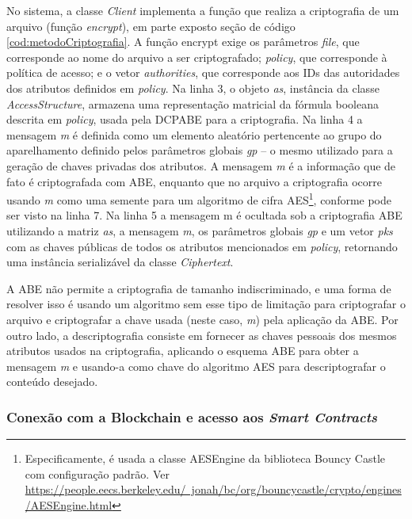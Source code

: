 \documentclass[a4paper,11pt]{article}
\begin{document}
No sistema, a classe \emph{Client} implementa a função que realiza a criptografia de um arquivo (função \emph{encrypt}), em parte exposto seção de código \ref{cod:metodoCriptografia}.
A função encrypt exige os parâmetros \emph{file}, que corresponde ao nome do arquivo a ser criptografado; \emph{policy}, que corresponde à política de acesso; e o vetor \emph{authorities}, que corresponde aos IDs das autoridades dos atributos definidos em \emph{policy}.
Na linha 3, o objeto \emph{as}, instância da classe \emph{AccessStructure}, armazena uma representação matricial da fórmula booleana descrita em \emph{policy}, usada pela DCPABE para a criptografia.
Na linha 4 a mensagem \emph{m} é definida como um elemento aleatório pertencente ao grupo do aparelhamento definido pelos parâmetros globais \emph{gp} -- o mesmo utilizado para a geração de chaves privadas dos atributos.
A mensagem \emph{m} é a informação que de fato é criptografada com ABE, enquanto que no arquivo  a criptografia ocorre usando \emph{m} como uma semente para um algoritmo de cifra AES\footnote{Especificamente, é usada a classe AESEngine da biblioteca Bouncy Castle com configuração padrão. Ver \href{https://people.eecs.berkeley.edu/~jonah/bc/org/bouncycastle/crypto/engines/AESEngine.html}{https://people.eecs.berkeley.edu/~jonah/bc/org/bouncycastle/crypto/engines/AESEngine.html}}, conforme pode ser visto na linha 7.
Na linha 5 a mensagem m é ocultada sob a criptografia ABE utilizando a matriz \emph{as}, a mensagem \emph{m}, os parâmetros globais \emph{gp} e um vetor \emph{pks} com as chaves públicas de todos os atributos mencionados em \emph{policy}, retornando uma instância serializável da classe \emph{Ciphertext}.

A ABE não permite a criptografia de tamanho indiscriminado, e uma forma de resolver isso é usando um algoritmo sem esse tipo de limitação para criptografar o arquivo e criptografar a chave usada (neste caso, \emph{m}) pela aplicação da ABE.
Por outro lado, a descriptografia consiste em fornecer as chaves pessoais dos mesmos atributos usados na criptografia, aplicando o esquema ABE para obter a mensagem \emph{m} e usando-a como chave do algoritmo AES para descriptografar o conteúdo desejado.


\subsubsection{Conexão com a Blockchain e acesso aos \textit{Smart Contracts}}
\end{document}
